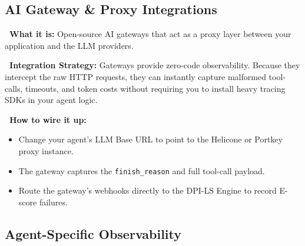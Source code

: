\documentclass[11pt,a4paper]{article}
\begin{document}
\vspace{0.3cm}

\subsection{AI Gateway \& Proxy Integrations}

\begin{tcolorbox}[enhanced, colback=gray!5!white, colframe=gray, title={\textbf{\faServer\ Helicone \& Portkey}}, fonttitle=\bfseries, boxrule=1pt, arc=2mm]
\textbf{\color{dpiblue}\faQuestionCircle\ What it is:} Open-source AI gateways that act as a proxy layer between your application and the LLM providers.

\vspace{0.2cm}
\textbf{\color{dpigreen}\faCogs\ Integration Strategy:} Gateways provide zero-code observability. Because they intercept the raw HTTP requests, they can instantly capture malformed tool-calls, timeouts, and token costs without requiring you to install heavy tracing SDKs in your agent logic.

\vspace{0.2cm}
\textbf{\color{dpicloud}\faPlug\ How to wire it up:}
\begin{itemize}
    \item \textbf{\color{gray}\faSync} Change your agent's LLM Base URL to point to the Helicone or Portkey proxy instance.
    \item \textbf{\color{gray}\faFileCode} The gateway captures the \texttt{finish\_reason} and full tool-call payload.
    \item \textbf{\color{gray}\faRoute} Route the gateway's webhooks directly to the DPI-LS Engine to record E-score failures.
\end{itemize}
\end{tcolorbox}

\vspace{0.3cm}

\subsection{Agent-Specific Observability}
\end{document}
